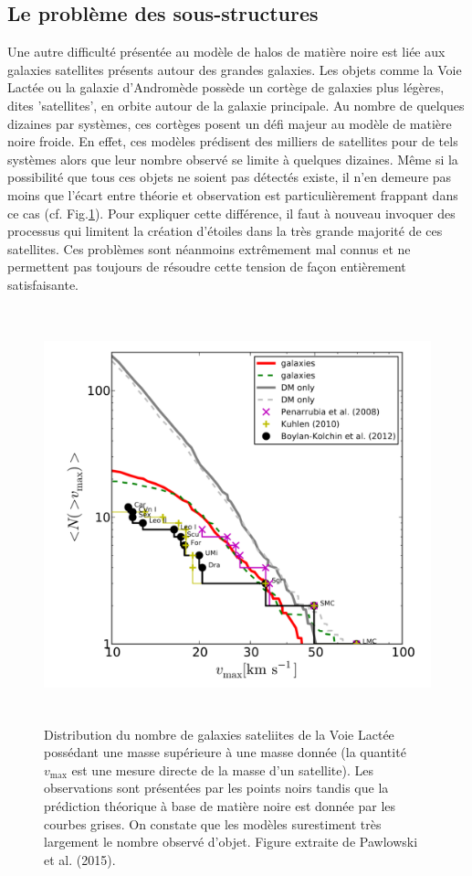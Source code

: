 \subsection{Le problème des sous-structures}
Une autre difficulté présentée au modèle de halos de matière noire est liée aux galaxies satellites présents autour des grandes galaxies. Les objets comme la Voie Lactée ou la galaxie d'Andromède possède un cortège de galaxies plus légères, dites 'satellites', en orbite autour de la galaxie principale. Au nombre de quelques dizaines par systèmes, ces cortèges posent un défi majeur au modèle de matière noire froide. En effet, ces modèles prédisent des milliers de satellites pour de tels systèmes alors que leur nombre observé se limite à quelques dizaines. Même si la possibilité que tous ces objets ne soient pas détectés existe, il n'en demeure pas moins que l'écart entre théorie et observation est particulièrement frappant dans ce cas (cf. Fig.\ref{f:missing}). Pour expliquer cette différence, il faut à nouveau invoquer des processus qui limitent la création d'étoiles dans la très grande majorité de ces satellites. Ces problèmes sont néanmoins extrêmement mal connus et ne permettent pas toujours de résoudre cette tension de façon entièrement satisfaisante.
\begin{figure}[htbp]
	\centering
		\includegraphics[height=12cm]{figs/missing.png}
	\caption[Distribution du nombre de galaxies sateliites de la Voie Lactée]{Distribution du nombre de galaxies sateliites de la Voie Lactée possédant une masse supérieure à une masse donnée (la quantité $v_\mathrm{max}$ est une mesure directe de la masse d'un satellite). Les observations sont présentées par les points noirs tandis que la prédiction théorique à base de matière noire est donnée par les courbes grises. On constate que les modèles surestiment très largement le nombre observé d'objet. Figure extraite de Pawlowski et al. (2015). } 
	\label{f:missing}
\end{figure}

